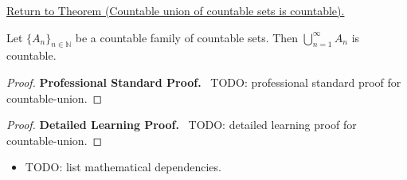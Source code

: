 \newpage
{}
\label{prf:countable-union}

\begin{remark*}[Return]
\hyperref[thm:countable-union]{Return to Theorem (Countable union of countable sets is countable).}
\end{remark*}

\begin{theorem*}
Let $\{A_n\}_{n \in \mathbb{N}}$ be a countable family of countable sets.
Then $\bigcup_{n=1}^{\infty} A_n$ is countable.
\end{theorem*}

\begin{proof}
\textbf{Professional Standard Proof.}~
TODO: professional standard proof for countable-union.
\end{proof}

\begin{proof}
\textbf{Detailed Learning Proof.}~
TODO: detailed learning proof for countable-union.
\end{proof}

\begin{remark*}
\end{remark*}

\begin{dependencies}
\begin{itemize}
  \item TODO: list mathematical dependencies.
\end{itemize}
\end{dependencies}

\clearpage
